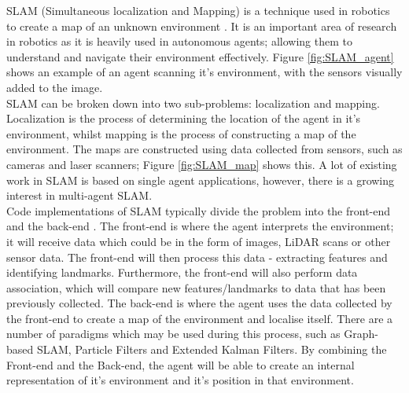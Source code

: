 \documentclass[12pt]{article}
\begin{document}
SLAM (Simultaneous localization and Mapping) is a technique used in robotics to create a map of an unknown environment \cite{SLAM_overview}.
It is an important area of research in robotics as it is heavily used in autonomous agents; allowing them to understand and navigate their environment
effectively. Figure \ref{fig:SLAM_agent} shows an example of an agent scanning it's environment, with the sensors visually added to the image.\\
SLAM can be broken down into two sub-problems: localization and mapping. Localization is the process of determining the
location of the agent in it's environment, whilst mapping is the process of constructing a map of the environment. The maps
are constructed using data collected from sensors, such as cameras and laser scanners; Figure \ref{fig:SLAM_map} shows this.
A lot of existing work in SLAM is based on single agent applications, however, there is a growing interest in multi-agent
SLAM.\\
Code implementations of SLAM typically divide the problem into the front-end and the back-end \cite{SLAM_components}.
The front-end is where the agent interprets the environment; it will receive data which could be in the form of images,
LiDAR scans or other sensor data. The front-end will then process this data - extracting features and identifying landmarks.
Furthermore, the front-end will also perform data association, which will compare new features/landmarks to data that has
been previously collected. The back-end is where the agent uses the data collected by the front-end to create a map
of the environment and localise itself. There are a number of paradigms which may be used during this process, such as Graph-based
SLAM, Particle Filters and Extended Kalman Filters. By combining the Front-end and the Back-end, the agent will be able to
create an internal representation of it's environment and it's position in that environment.
\end{document}
